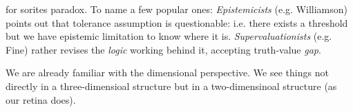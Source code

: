 \documentclass{tufte-handout}
\begin{document}
 for sorites paradox.
To name a few popular ones:
\emph{Epistemicists} (e.g. Williamson) points out that tolerance assumption is questionable: i.e. there exists a threshold but we have epistemic limitation to know where it is.
\emph{Supervaluationists} (e.g. Fine) rather revises the \emph{logic} working behind it, accepting truth-value \emph{gap}.

We are already familiar with the dimensional perspective.
We see things not directly in a three-dimensioal structure but in a two-dimensinoal structure (as our retina does).




\pagebreak



\end{document}
